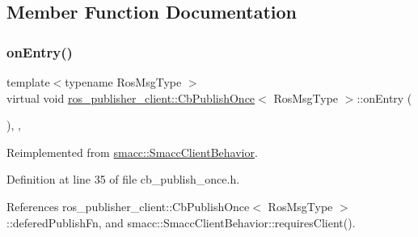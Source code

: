 \subsection{Member Function Documentation}
\mbox{\label{classros__publisher__client_1_1CbPublishOnce_a223cb50cd7e4041d42106eb600575bae}} 
\subsubsection{\texorpdfstring{on\+Entry()}{onEntry()}}
{\footnotesize\ttfamily template$<$typename Ros\+Msg\+Type $>$ \\
virtual void \hyperlink{classros__publisher__client_1_1CbPublishOnce}{ros\+\_\+publisher\+\_\+client\+::\+Cb\+Publish\+Once}$<$ Ros\+Msg\+Type $>$\+::on\+Entry (\begin{DoxyParamCaption}{ }\end{DoxyParamCaption})\hspace{0.3cm}{\ttfamily [inline]}, {\ttfamily [override]}, {\ttfamily [virtual]}}



Reimplemented from \hyperlink{classsmacc_1_1SmaccClientBehavior_a7962382f93987c720ad432fef55b123f}{smacc\+::\+Smacc\+Client\+Behavior}.



Definition at line 35 of file cb\+\_\+publish\+\_\+once.\+h.



References ros\+\_\+publisher\+\_\+client\+::\+Cb\+Publish\+Once$<$ Ros\+Msg\+Type $>$\+::defered\+Publish\+Fn, and smacc\+::\+Smacc\+Client\+Behavior\+::requires\+Client().


